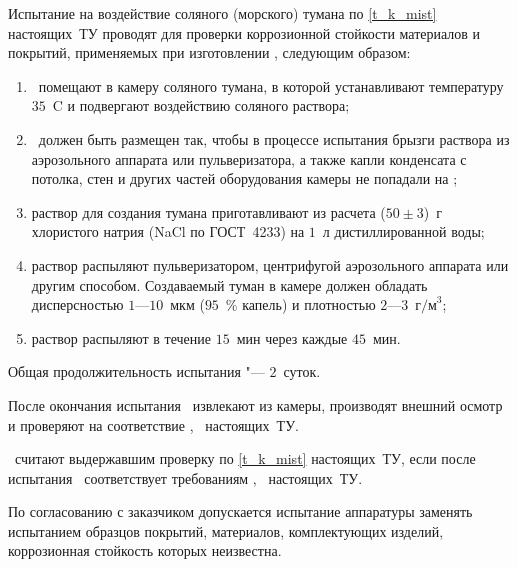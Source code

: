 Испытание на воздействие соляного (морского) тумана по \ref{t_k_mist} настоящих~ТУ проводят для проверки коррозионной стойкости материалов и покрытий, применяемых при изготовлении \dut, следующим образом:
%
\begin{enumerate}
	\item \dut \  помещают в камеру соляного тумана, в которой  устанавливают температуру $35$~\degree C и подвергают воздействию соляного раствора;
	\item \dut \ должен быть размещен так, чтобы в процессе испытания брызги раствора из аэрозольного аппарата или пульверизатора, а также капли конденсата с потолка, стен и других частей оборудования камеры не попадали на \dut;
	\item раствор для создания тумана приготавливают из расчета ($50 \pm 3$)~г хлористого натрия (NaCl по ГОСТ~4233) на $1$~л дистиллированной воды;
	\item раствор распыляют пульверизатором, центрифугой аэрозольного аппарата или другим способом. Создаваемый туман в камере должен обладать дисперсностью $1$---$10$~мкм ($95$~\% капель) и плотностью $2$---$3$~$\text{г/м}^3$;
	\item раствор распыляют в течение $15$~мин через каждые $45$~мин.
\end{enumerate}
	
Общая продолжительность испытания "--- $2$~суток.
	
После окончания испытания \dut \ извлекают из камеры, производят внешний осмотр и проверяют на соответствие \treb, \trebafter \ настоящих~ТУ.

\dut \  считают выдержавшим проверку по \ref{t_k_mist} настоящих~ТУ, если после испытания \dut \  соответствует требованиям \treb, \trebafter \ настоящих~ТУ.

По согласованию с заказчиком допускается испытание аппаратуры заменять испытанием образцов покрытий, материалов, комплектующих изделий, коррозионная стойкость которых неизвестна.